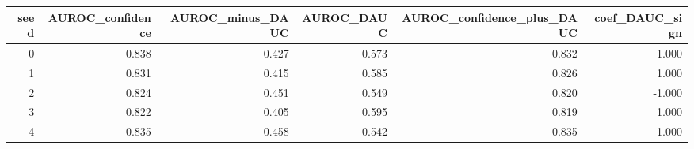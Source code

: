 \begin{tabular}{rrrrrr}
\toprule
seed & AUROC_confidence & AUROC_minus_DAUC & AUROC_DAUC & AUROC_confidence_plus_DAUC & coef_DAUC_sign \\
\midrule
0 & 0.838 & 0.427 & 0.573 & 0.832 & 1.000 \\
1 & 0.831 & 0.415 & 0.585 & 0.826 & 1.000 \\
2 & 0.824 & 0.451 & 0.549 & 0.820 & -1.000 \\
3 & 0.822 & 0.405 & 0.595 & 0.819 & 1.000 \\
4 & 0.835 & 0.458 & 0.542 & 0.835 & 1.000 \\
\bottomrule
\end{tabular}
